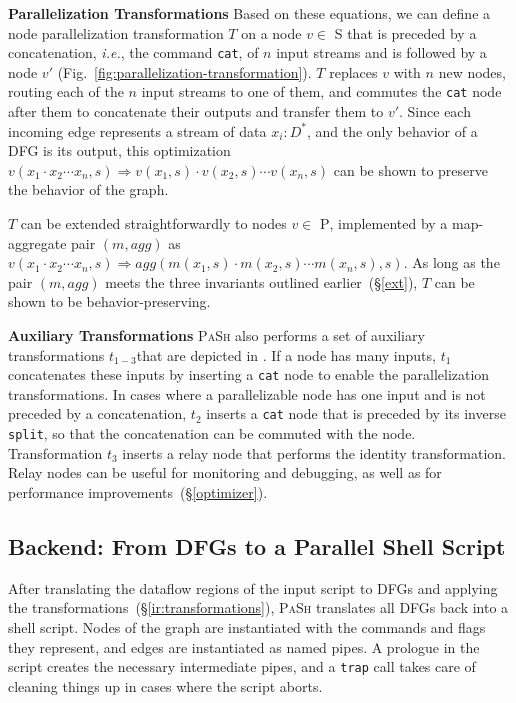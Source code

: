 \documentclass[sigplan, review, screen, anonymous]{acmart}
\newcommand{\ie}{{\em i.e.}, }
\newcommand{\heading}[1]{\vspace{4pt}\noindent\textbf{#1}\enspace}
\newcommand{\ttt}[1]{\texttt{#1}}
\newcommand{\cn}[1]{\mbox{\textcircled{\footnotesize #1}}}
\newcommand{\sta}{\cn{\textsc{S}}\xspace}
\newcommand{\pur}{\cn{\textsc{P}}\xspace}
\newcommand{\todo}[1]{\hl{#1}\xspace}
\newcommand{\kk}[1]{[{\color{magenta}kk: #1}]}
\newcommand{\sx}[1]{(\S\ref{#1})}
\newcommand{\sys}{{\scshape PaSh}\xspace}
\begin{document}
\heading{Parallelization Transformations}
%
Based on these equations, we can define a node parallelization
  transformation $T$ on a node $v \in$ \sta that is preceded by a
concatenation, \ie the command \ttt{cat}, of $n$ input streams and is
followed by a node $v'$
(Fig.~\ref{fig:parallelization-transformation}). $T$
replaces $v$ with $n$ new nodes, routing each of the $n$ input streams
to one of them, and commutes the \ttt{cat} node after them to
concatenate their outputs and transfer them to $v'$. Since each
incoming edge represents a stream of data $x_i : D^*$, and the only
behavior of a DFG is its output, this optimization $v(x_1 \cdot x_2
\cdots x_n, s) \Rightarrow v(x_1, s) \cdot v(x_2, s) \cdots v(x_n, s)$
can be shown to preserve the behavior of the graph.

$T$ can be extended straightforwardly to nodes $v \in$ \pur,
implemented by a map-aggregate pair $(m, agg)$ as $ v(x_1 \cdot x_2
\cdots x_n, s) \Rightarrow agg(m(x_1, s) \cdot m(x_2, s) \cdots m(x_n,
s), s)$.
As long as the pair $(m, agg)$ meets the three invariants outlined earlier~\sx{ext}, 
$T$ can be shown to be behavior-preserving.

\heading{Auxiliary Transformations}
%
\sys also performs a set of auxiliary transformations $t_{1-3}$that are
depicted in . If a node has many
inputs, $t_1$ concatenates these inputs by inserting a \ttt{cat} node
to enable the parallelization transformations. In cases where a
parallelizable node has one input and is not preceded by a
concatenation, $t_2$ inserts a \ttt{cat} node that is preceded by its
inverse \ttt{split}, so that the concatenation can be commuted with
the node. Transformation $t_3$ inserts a relay node that
performs the identity transformation. Relay nodes can be useful for
monitoring and debugging, as well as for performance
improvements~\sx{optimizer}.

\subsection{Backend: From DFGs to a Parallel Shell Script}
\label{backend}

After translating the dataflow regions of the input script to DFGs and applying the transformations~\sx{ir:transformations},
  \sys translates all DFGs back into a shell script.
Nodes of the graph are instantiated with the commands and flags they represent, and edges are instantiated as named pipes.
A prologue in the script creates the necessary intermediate pipes, and a \ttt{trap} call takes care of cleaning things up in cases where the script aborts.
\end{document}
